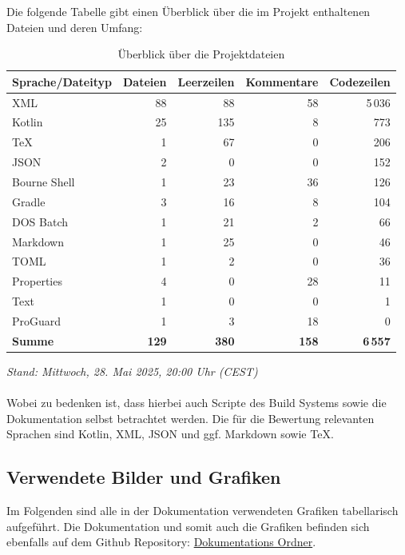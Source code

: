 \documentclass[12pt,a4paper]{article}
\begin{document}
Die folgende Tabelle gibt einen Überblick über die im Projekt enthaltenen Dateien und deren Umfang:

\begin{table}[htbp]
\centering
\caption{Überblick über die Projektdateien}
\begin{tabularx}{\textwidth}{lrrrr}
\toprule
\textbf{Sprache/Dateityp} & \textbf{Dateien} & \textbf{Leerzeilen} & \textbf{Kommentare} & \textbf{Codezeilen} \\
\midrule
XML            & 88  & 88  & 58  & 5\,036 \\
Kotlin         & 25  & 135 & 8   & 773    \\
TeX            & 1   & 67  & 0   & 206    \\
JSON           & 2   & 0   & 0   & 152    \\
Bourne Shell   & 1   & 23  & 36  & 126    \\
Gradle         & 3   & 16  & 8   & 104    \\
DOS Batch      & 1   & 21  & 2   & 66     \\
Markdown       & 1   & 25  & 0   & 46     \\
TOML           & 1   & 2   & 0   & 36     \\
Properties     & 4   & 0   & 28  & 11     \\
Text           & 1   & 0   & 0   & 1      \\
ProGuard       & 1   & 3   & 18  & 0      \\
\midrule
\textbf{Summe} & \textbf{129} & \textbf{380} & \textbf{158} & \textbf{6\,557} \\
\bottomrule
\end{tabularx}
\end{table}

\textit{Stand: Mittwoch, 28. Mai 2025, 20:00 Uhr (CEST)}
\\\\
Wobei zu bedenken ist, dass hierbei auch Scripte des Build Systems sowie die Dokumentation selbst betrachtet werden. Die für die Bewertung relevanten Sprachen sind Kotlin, XML, JSON und ggf. Markdown sowie TeX.

\newpage
\subsection*{Verwendete Bilder und Grafiken}

Im Folgenden sind alle in der Dokumentation verwendeten Grafiken tabellarisch aufgeführt. Die Dokumentation und somit auch die Grafiken befinden sich ebenfalls auf dem Github Repository: \href{https://github.com/Erik-Donath/Palabra/tree/cc55c524ebff2f6db85a36f6ec2c0afb23070e2f/docs}{Dokumentations Ordner}.
\end{document}
